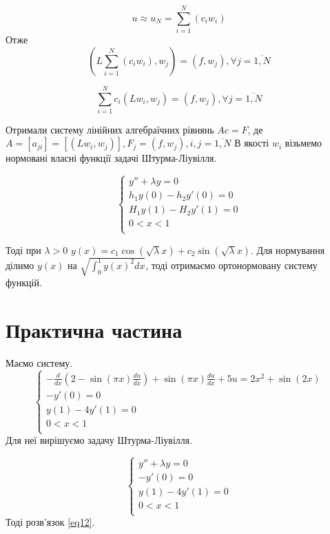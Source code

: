 \documentclass[14pt,a4paper]{scrartcl}
\begin{document}
	\begin{equation} \label{eq7}
		u \approx u_N = \sum_{i=1}^{N}(c_{i}w_{i})
	\end{equation}
	Отже
	\begin{equation} \label{eq8}
	\left(L \sum_{i=1}^{N}(c_i w_i), w_j\right) = \left(f,w_j\right), \forall j= \overline{1,N}
	\end{equation}
	
	\begin{equation} \label{eq9}
	\sum_{i=1}^{N}c_i\left(Lw_i, w_j\right) = \left(f,w_j\right), \forall j= \overline{1,N}
	\end{equation}
	
	Отримали систему лінійних алгебраїчних рівнянь $Ac=F$, де $A = [a_{ji}]= \left[\left(Lw_i,w_j\right)\right], F_{j}=\left(f,w_j\right), i,j=\overline{1,N}$
	В якості $w_i$ візьмемо нормовані власні функції задачі Штурма-Ліувілля.
	
	\begin{equation}\label{eq10}
		\begin{cases}
			y'' +\lambda y=0\\
			h_1y(0) - h_2y'(0) =0 \\
			H_1y(1) - H_2y'(1) =0 \\
			0<x<1\\
		\end{cases}
	\end{equation}
	
	Тоді при $\lambda>0$ $y(x)=c_1\cos(\sqrt{\lambda}x)+c_2\sin(\sqrt{\lambda}x)$. Для нормування ділимо $y(x)$ на $\sqrt{\int_{0}^{1}y(x)^{2}dx}$, тоді отримаємо ортонормовану систему функцій.
	
	\section{Практична частина}
	Маємо систему.
	\begin{equation}\label{eq11}
		\begin{cases}
			-\frac{d}{dx}(2-\sin(\pi x)\frac{du}{dx})+\sin(\pi x)\frac{du}{dx}+5u=2x^{2} + \sin(2x)  \\ 
			 -y'(0) =0 \\
			y(1) - 4y'(1) =0 \\
			0<x<1\\
		\end{cases}
	\end{equation}
	Для неї вирішуємо задачу Штурма-Ліувілля.
	
	\begin{equation}\label{eq12}
	\begin{cases}
	y'' + \lambda y =0\\
	-y'(0) =0 \\
	y(1) - 4y'(1) =0 \\
	0<x<1\\
	\end{cases}
	\end{equation}
	Тоді розв'язок \ref{eq12}.
	
\end{document}
